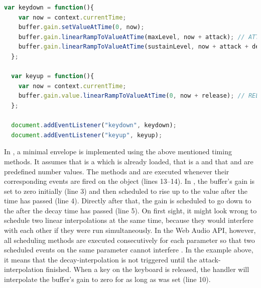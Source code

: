 \begin{lstlisting}[language=JavaScript, caption=A minimalistic ADSR envelope in JavaScript, label=lst:adsrenvelope]
  var keydown = function(){
    var now = context.currentTime;
    buffer.gain.setValueAtTime(0, now);
    buffer.gain.linearRampToValueAtTime(maxLevel, now + attack); // ATTACK
    buffer.gain.linearRampToValueAtTime(sustainLevel, now + attack + decay ); // DECAY
  };

  var keyup = function(){
    var now = context.currentTime;
    buffer.gain.value.linearRampToValueAtTime(0, now + release); // RELEASE
  };

  document.addEventListener("keydown", keydown);
  document.addEventListener("keyup", keyup);
\end{lstlisting}

In , a minimal envelope is implemented using the above mentioned timing methods. It assumes that  is a  which is already loaded, that  is a  and that  and  are predefined number values. The methods  and  are executed whenever their corresponding events are fired on the  object (lines 13--14). In , the buffer's gain is set to zero initially (line 3) and then scheduled to rise up to the  value after the  time has passed (line 4). Directly after that, the gain is scheduled to go down to the  after the decay time has passed (line 5). On first sight, it might look wrong to schedule two linear interpolations at the same time, because they would interfere with each other if they were run simultaneously. In the Web Audio API, however, all scheduling methods are executed consecutively for each parameter so that two scheduled events on the same parameter cannot interfere \cite[Chapter 4.5.2.]{wilson2014webaudiospec}. In the example above, it means that the decay-interpolation is not triggered until the attack-interpolation finished. When a key on the keyboard is released, the  handler will interpolate the buffer's gain to zero for as long as  was set (line 10). 